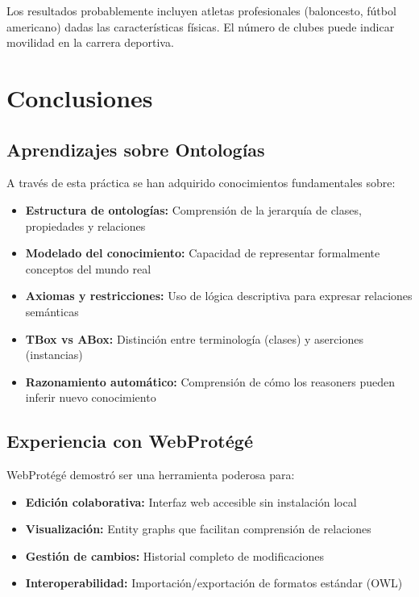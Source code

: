 \documentclass[12pt,a4paper]{article}
\begin{document}
Los resultados probablemente incluyen atletas profesionales (baloncesto, fútbol americano) dadas las características físicas. El número de clubes puede indicar movilidad en la carrera deportiva.

\section{Conclusiones}

\subsection{Aprendizajes sobre Ontologías}

A través de esta práctica se han adquirido conocimientos fundamentales sobre:

\begin{itemize}
    \item \textbf{Estructura de ontologías:} Comprensión de la jerarquía de clases, propiedades y relaciones
    \item \textbf{Modelado del conocimiento:} Capacidad de representar formalmente conceptos del mundo real
    \item \textbf{Axiomas y restricciones:} Uso de lógica descriptiva para expresar relaciones semánticas
    \item \textbf{TBox vs ABox:} Distinción entre terminología (clases) y aserciones (instancias)
    \item \textbf{Razonamiento automático:} Comprensión de cómo los reasoners pueden inferir nuevo conocimiento
\end{itemize}

\subsection{Experiencia con WebProtégé}

WebProtégé demostró ser una herramienta poderosa para:

\begin{itemize}
    \item \textbf{Edición colaborativa:} Interfaz web accesible sin instalación local
    \item \textbf{Visualización:} Entity graphs que facilitan comprensión de relaciones
    \item \textbf{Gestión de cambios:} Historial completo de modificaciones
    \item \textbf{Interoperabilidad:} Importación/exportación de formatos estándar (OWL)
\end{itemize}
\end{document}
